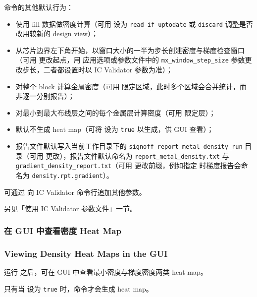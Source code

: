 命令的其他默认行为：
\begin{itemize}
  \item 使用 fill 数据做密度计算（可用  设为 \texttt{read\_if\_uptodate} 或 \texttt{discard} 调整是否改用较新的 design view）；
  \item 从芯片边界左下角开始，以窗口大小的一半为步长创建密度与梯度检查窗口（可用  更改起点，用  应用选项或参数文件中的 \texttt{mx\_window\_step\_size} 参数更改步长，二者都设置时以 IC Validator 参数为准）；
  \item 对整个 block 计算金属密度（可用  限定区域，此时多个区域会合并统计，而非逐一分别报告）；
  \item 对最小到最大布线层之间的每个金属层计算密度（可用  限定层）；
  \item 默认不生成 heat map（可将  设为 \texttt{true} 以生成，供 GUI 查看）；
  \item 报告文件默认写入当前工作目录下的 \texttt{signoff\_report\_metal\_density\_run} 目录（可用  更改），报告文件默认命名为 \texttt{report\_metal\_density.txt} 与 \texttt{gradient\_density\_report.txt}（可用  更改前缀，例如指定  时梯度报告会命名为 \texttt{density.rpt.gradient}）。
\end{itemize}

可通过  向 IC Validator 命令行追加其他参数。

\begin{seeAlsoBox}
另见「使用 IC Validator 参数文件」一节。
\end{seeAlsoBox}

\subsubsection{在 GUI 中查看密度 Heat Map}
\subsubsection*{Viewing Density Heat Maps in the GUI}

运行  之后，可在 GUI 中查看最小密度与梯度密度两类 heat map。

\begin{noteBox}
只有当  设为 \texttt{true} 时，命令才会生成 heat map。
\end{noteBox}

